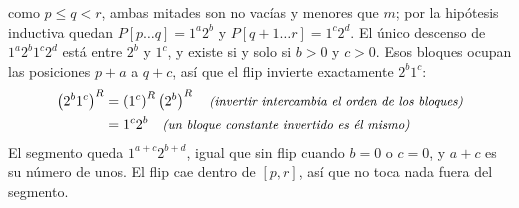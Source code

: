 \documentclass[11pt,letterpaper]{article}
\begin{document}
 como $p \le q < r$, ambas mitades son no vacías
y menores que $m$; por la hipótesis inductiva quedan
$P[p \ldots q] = 1^{a} 2^{b}$ y $P[q + 1 \ldots r] = 1^{c} 2^{d}$.
El único descenso de $1^{a} 2^{b} 1^{c} 2^{d}$ está entre $2^{b}$ y
$1^{c}$, y existe si y solo si $b > 0$ y $c > 0$. Esos bloques ocupan
las posiciones $p + a$ a $q + c$, así que el flip invierte
exactamente $2^{b} 1^{c}$:
\begin{align*}
  \left(2^{b} 1^{c}\right)^{R}
    &= \left(1^{c}\right)^{R} \left(2^{b}\right)^{R}
       \quad\text{\small\itshape (invertir intercambia el orden de los bloques)} \\
    &= 1^{c} 2^{b}
       \quad\text{\small\itshape (un bloque constante invertido es él mismo)}
\end{align*}
El segmento queda $1^{a+c} 2^{b+d}$, igual que sin flip cuando $b = 0$
o $c = 0$, y $a + c$ es su número de unos. El flip cae dentro de
$[p, r]$, así que no toca nada fuera del segmento.

\end{document}
